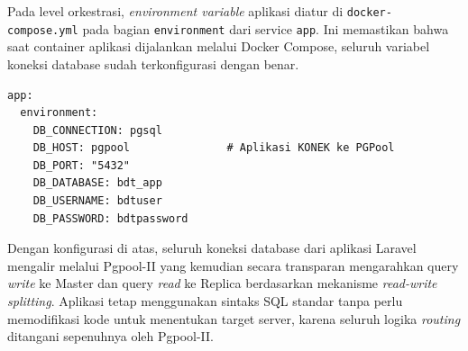 Pada level orkestrasi, \textit{environment variable} aplikasi diatur
di \texttt{docker-compose.yml} pada bagian \texttt{environment} dari
service \texttt{app}. Ini memastikan bahwa saat container aplikasi
dijalankan melalui Docker Compose, seluruh variabel koneksi database
sudah terkonfigurasi dengan benar.

\begin{lstlisting}[caption={Environment Variable Aplikasi di
docker-compose.yml}, label={lst:compose-env}]
app:
  environment:
    DB_CONNECTION: pgsql
    DB_HOST: pgpool               # Aplikasi KONEK ke PGPool
    DB_PORT: "5432"
    DB_DATABASE: bdt_app
    DB_USERNAME: bdtuser
    DB_PASSWORD: bdtpassword
\end{lstlisting}

Dengan konfigurasi di atas, seluruh koneksi database dari aplikasi
Laravel mengalir melalui Pgpool-II yang kemudian secara transparan
mengarahkan query \textit{write} ke Master dan query \textit{read} ke
Replica berdasarkan mekanisme \textit{read-write splitting}. Aplikasi
tetap menggunakan sintaks SQL standar tanpa perlu memodifikasi kode
untuk menentukan target server, karena seluruh logika \textit{routing}
ditangani sepenuhnya oleh Pgpool-II.

